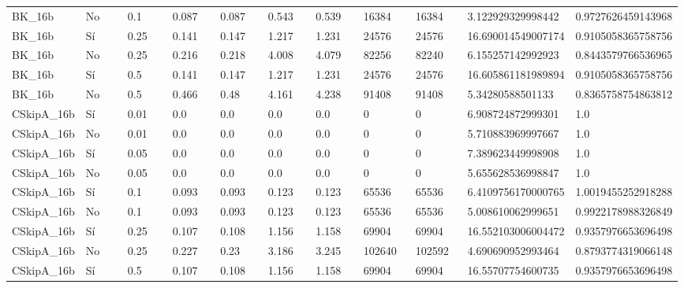 {{\begin{longtable}{M{0.09\linewidth}M{0.09\linewidth}M{0.09\linewidth}M{0.09\linewidth}M{0.09\linewidth}M{0.09\linewidth}M{0.09\linewidth}M{0.09\linewidth}M{0.09\linewidth}M{0.09\linewidth}M{0.09\linewidth}}
BK\_16b & No & \num{0.1} & \num{0.087} & \num{0.087} & \num{0.543} & \num{0.539} & \num{16384} & \num{16384} & \num{3.122929329998442} & \num{0.9727626459143968} \\
BK\_16b & Sí & \num{0.25} & \num{0.141} & \num{0.147} & \num{1.217} & \num{1.231} & \num{24576} & \num{24576} & \num{16.690014549007174} & \num{0.9105058365758756} \\
BK\_16b & No & \num{0.25} & \num{0.216} & \num{0.218} & \num{4.008} & \num{4.079} & \num{82256} & \num{82240} & \num{6.155257142992923} & \num{0.8443579766536965} \\
BK\_16b & Sí & \num{0.5} & \num{0.141} & \num{0.147} & \num{1.217} & \num{1.231} & \num{24576} & \num{24576} & \num{16.605861181989894} & \num{0.9105058365758756} \\
BK\_16b & No & \num{0.5} & \num{0.466} & \num{0.48} & \num{4.161} & \num{4.238} & \num{91408} & \num{91408} & \num{5.34280588501133} & \num{0.8365758754863812} \\
CSkipA\_16b & Sí & \num{0.01} & \num{0.0} & \num{0.0} & \num{0.0} & \num{0.0} & \num{0} & \num{0} & \num{6.908724872999301} & \num{1.0} \\
CSkipA\_16b & No & \num{0.01} & \num{0.0} & \num{0.0} & \num{0.0} & \num{0.0} & \num{0} & \num{0} & \num{5.710883969997667} & \num{1.0} \\
CSkipA\_16b & Sí & \num{0.05} & \num{0.0} & \num{0.0} & \num{0.0} & \num{0.0} & \num{0} & \num{0} & \num{7.389623449998908} & \num{1.0} \\
CSkipA\_16b & No & \num{0.05} & \num{0.0} & \num{0.0} & \num{0.0} & \num{0.0} & \num{0} & \num{0} & \num{5.655628536998847} & \num{1.0} \\
CSkipA\_16b & Sí & \num{0.1} & \num{0.093} & \num{0.093} & \num{0.123} & \num{0.123} & \num{65536} & \num{65536} & \num{6.4109756170000765} & \num{1.0019455252918288} \\
CSkipA\_16b & No & \num{0.1} & \num{0.093} & \num{0.093} & \num{0.123} & \num{0.123} & \num{65536} & \num{65536} & \num{5.008610062999651} & \num{0.9922178988326849} \\
CSkipA\_16b & Sí & \num{0.25} & \num{0.107} & \num{0.108} & \num{1.156} & \num{1.158} & \num{69904} & \num{69904} & \num{16.552103006004472} & \num{0.9357976653696498} \\
CSkipA\_16b & No & \num{0.25} & \num{0.227} & \num{0.23} & \num{3.186} & \num{3.245} & \num{102640} & \num{102592} & \num{4.690690952993464} & \num{0.8793774319066148} \\
CSkipA\_16b & Sí & \num{0.5} & \num{0.107} & \num{0.108} & \num{1.156} & \num{1.158} & \num{69904} & \num{69904} & \num{16.55707754600735} & \num{0.9357976653696498} \\

\end{longtable}}}
